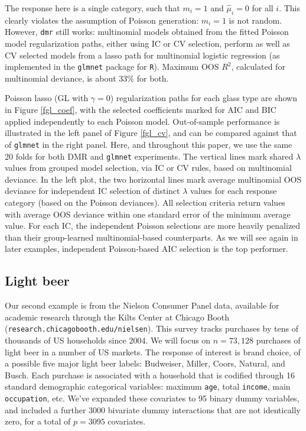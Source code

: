 \documentclass[12pt]{article}
\newcommand{\cd}[1]{{\tt#1}}
\begin{document}
The response here is a single category, such that $m_i = 1$ and $\hat\mu_i=0$
for all $i$.  This clearly violates the assumption of Poisson generation:
$m_i=1$ is not random.  However, \cd{dmr} still works:  multinomial models
obtained from the fitted Poisson model regularization paths, either using IC
or CV selection, perform as well as CV selected models from a lasso path for
multinomial logistic regression (as implemented in the \cd{glmnet} package for
\cd{R}).  Maximum OOS $R^2$, calculated for multinomial deviance, is about
33\% for both.

Poisson lasso (GL with $\gamma=0$) regularization paths for each glass type
are shown in Figure \ref{fgl_coef}, with the selected coefficients marked for
AIC and BIC applied independently to each Poisson model.  Out-of-sample
performance is illustrated in the left panel of Figure \ref{fgl_cv}, and can
be compared against that of \cd{glmnet} in the right panel.  Here, and
throughout this paper, we use the same 20 folds for both DMR and \cd{glmnet}
experiments.  The vertical lines mark shared $\lambda$ values from grouped
model selection, via IC or CV rules, based on multinomial deviance.  In the
left plot, the two horizontal lines mark average multinomial OOS deviance for
independent IC selection of distinct $\lambda$ values for each response
category (based on the Poisson deviances).  All selection criteria return
values with average OOS deviance within one standard error of the minimum
average value.  For each IC, the independent Poisson selections are more
heavily penalized than their group-learned multinomial-based counterparts.  As
we will see again in later examples, independent Poisson-based AIC selection
is the top performer.

\subsection{Light beer}

Our second example is from the Nielson Consumer Panel data, available for
academic research through the Kilts Center at Chicago Booth
(\cd{research.chicagobooth.edu/nielsen}).  This survey tracks purchases by
tens of thousands of US households since 2004.  We will focus on $n=73,128$
purchases of light beer in a number of US markets.  The response of interest
is brand choice, of a possible five major light beer labels: Budweiser,
Miller, Coors, Natural, and Busch.  Each purchase is associated with a
household that is codified through 16 standard demographic categorical
variables: maximum \cd{age}, total \cd{income}, main \cd{occupation}, etc.
We've expanded these covariates to 95 binary dummy variables, and included a
further 3000 bivariate dummy interactions that are not identically zero, for a
total of $p=3095$ covariates.
\end{document}
